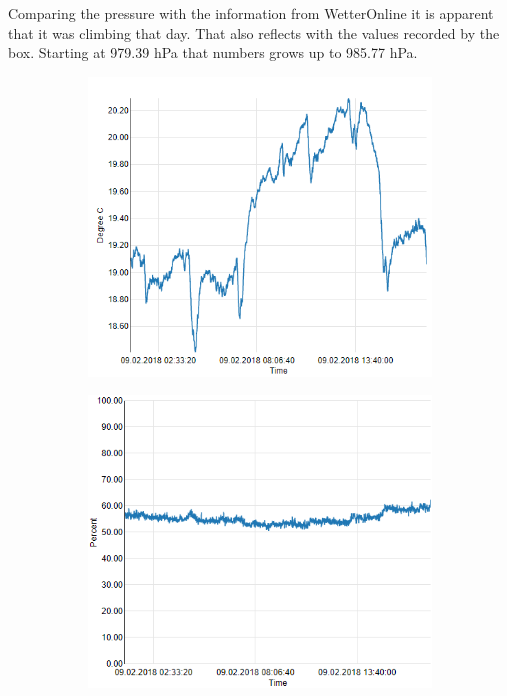 \documentclass[bachelorthesis, grey, english]{mas-thesis-chapters} %
\begin{document}
Comparing the pressure with the information from WetterOnline it is apparent that it was climbing that day. That also reflects with the values recorded by the box. Starting at 979.39 \gls{hPa} that numbers grows up to 985.77 \gls{hPa}.

\begin{figure}
\begin{subfigure}[c]{0.5\textwidth}
\includegraphics[width=1\textwidth]{expEval/Temp_09-02-2018.PNG}
\label{fig:evalTemp}
\end{subfigure}
\begin{subfigure}[c]{0.5\textwidth}
\includegraphics[width=1\textwidth]{expEval/Hum_09-02-2018.PNG}

\end{subfigure}
\end{figure}
\end{document}
